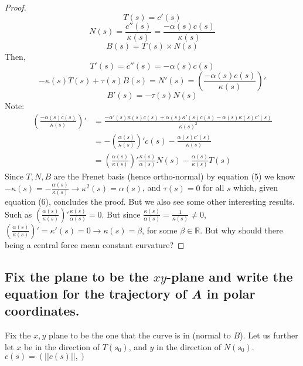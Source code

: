 \documentclass[12pt]{amsart}
\begin{document}
\begin{proof}
\begin{equation}
	T(s)=c'(s)
\end{equation}
\begin{equation}
	N(s)=\frac{c''(s)}{\kappa(s)}=\frac{-\alpha(s)c(s)}{\kappa(s)}
\end{equation}
\begin{equation}
	B(s)=T(s)\times N(s)
\end{equation}
Then,
\begin{equation}
	T'(s)=c''(s)=-\alpha(s)c(s)
\end{equation}
\begin{equation}
	-\kappa(s)T(s)+\tau(s)B(s)=N'(s)=\left(\frac{-\alpha(s)c(s)}{\kappa(s)}\right)'
\end{equation}
\begin{equation}
	B'(s)=-\tau(s)N(s)
\end{equation}
Note: 
\begin{align*}
	\left(\frac{-\alpha(s)c(s)}{\kappa(s)}\right)'&=\frac{-\alpha'(s)\kappa(s)c(s)+\alpha(s)\kappa'(s)c(s)-\alpha(s)\kappa(s)c'(s)}{\kappa(s)^2}
	\\&=-\left(\frac{\alpha(s)}{\kappa(s)}\right)'c(s)-\frac{\alpha(s)c'(s)}{\kappa(s)}
	\\&=\left(\frac{\alpha(s)}{\kappa(s)}\right)'\frac{\kappa(s)}{\alpha(s)}N(s)-\frac{\alpha(s)}{\kappa(s)}T(s)
\end{align*}
Since $T,N,B$ are the Frenet basis (hence ortho-normal) by equation (5) we know $-\kappa(s)=-\frac{\alpha(s)}{\kappa(s)}\rightarrow \kappa^2(s)=\alpha(s)$, and $\tau(s)=0$ for all $s$ which, given equation (6), concludes the proof. But we also see some other interesting results. Such as $\left(\frac{\alpha(s)}{\kappa(s)}\right)'\frac{\kappa(s)}{\alpha(s)}=0$. But since $\frac{\kappa(s)}{\alpha(s)}=\frac{1}{\kappa(s)}\neq0$, $\left(\frac{\alpha(s)}{\kappa(s)}\right)'=\kappa'(s)=0\rightarrow\kappa(s)=\beta$, for some $\beta\in\mathbb{R}$. But why should there being a central force mean constant curvature?
\end{proof}

\subsection{Fix the plane to be the $xy$-plane and write the equation for the trajectory of \emph{A} in polar coordinates.}
Fix the $x,y$ plane to be the one that the curve is in (normal to $B$). Let us further let $x$ be in the direction of $T(s_0)$, and $y$ in the direction of $N(s_0)$. $c(s)=(||c(s)||,)$
\end{document}
